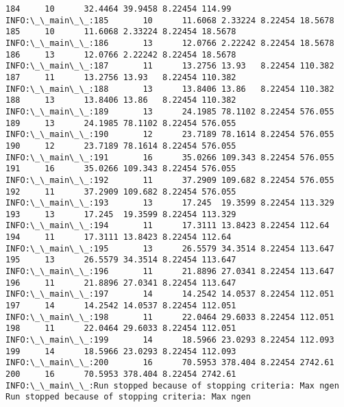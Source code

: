 \documentclass[11pt]{article}
\begin{document}
\begin{Verbatim}[commandchars=\\\{\}]
184     10      32.4464 39.9458 8.22454 114.99
INFO:\_\_main\_\_:185       10      11.6068 2.33224 8.22454 18.5678
185     10      11.6068 2.33224 8.22454 18.5678
INFO:\_\_main\_\_:186       13      12.0766 2.22242 8.22454 18.5678
186     13      12.0766 2.22242 8.22454 18.5678
INFO:\_\_main\_\_:187       11      13.2756 13.93   8.22454 110.382
187     11      13.2756 13.93   8.22454 110.382
INFO:\_\_main\_\_:188       13      13.8406 13.86   8.22454 110.382
188     13      13.8406 13.86   8.22454 110.382
INFO:\_\_main\_\_:189       13      24.1985 78.1102 8.22454 576.055
189     13      24.1985 78.1102 8.22454 576.055
INFO:\_\_main\_\_:190       12      23.7189 78.1614 8.22454 576.055
190     12      23.7189 78.1614 8.22454 576.055
INFO:\_\_main\_\_:191       16      35.0266 109.343 8.22454 576.055
191     16      35.0266 109.343 8.22454 576.055
INFO:\_\_main\_\_:192       11      37.2909 109.682 8.22454 576.055
192     11      37.2909 109.682 8.22454 576.055
INFO:\_\_main\_\_:193       13      17.245  19.3599 8.22454 113.329
193     13      17.245  19.3599 8.22454 113.329
INFO:\_\_main\_\_:194       11      17.3111 13.8423 8.22454 112.64
194     11      17.3111 13.8423 8.22454 112.64
INFO:\_\_main\_\_:195       13      26.5579 34.3514 8.22454 113.647
195     13      26.5579 34.3514 8.22454 113.647
INFO:\_\_main\_\_:196       11      21.8896 27.0341 8.22454 113.647
196     11      21.8896 27.0341 8.22454 113.647
INFO:\_\_main\_\_:197       14      14.2542 14.0537 8.22454 112.051
197     14      14.2542 14.0537 8.22454 112.051
INFO:\_\_main\_\_:198       11      22.0464 29.6033 8.22454 112.051
198     11      22.0464 29.6033 8.22454 112.051
INFO:\_\_main\_\_:199       14      18.5966 23.0293 8.22454 112.093
199     14      18.5966 23.0293 8.22454 112.093
INFO:\_\_main\_\_:200       16      70.5953 378.404 8.22454 2742.61
200     16      70.5953 378.404 8.22454 2742.61
INFO:\_\_main\_\_:Run stopped because of stopping criteria: Max ngen
Run stopped because of stopping criteria: Max ngen
    \end{Verbatim}

    \begin{Verbatim}[commandchars=\\\{\}]

    \end{Verbatim}
\end{document}
